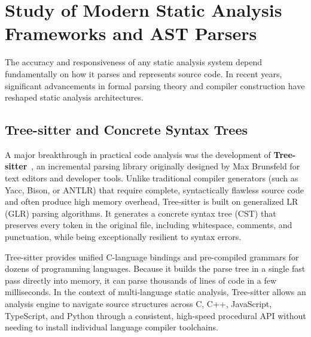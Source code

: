\section{Study of Modern Static Analysis Frameworks and AST Parsers}
The accuracy and responsiveness of any static analysis system depend fundamentally on how it parses and represents source code. In recent years, significant advancements in formal parsing theory and compiler construction have reshaped static analysis architectures.

\subsection{Tree-sitter and Concrete Syntax Trees}
A major breakthrough in practical code analysis was the development of \textbf{Tree-sitter}~\cite{treesitter}, an incremental parsing library originally designed by Max Brunsfeld for text editors and developer tools. Unlike traditional compiler generators (such as Yacc, Bison, or ANTLR) that require complete, syntactically flawless source code and often produce high memory overhead, Tree-sitter is built on generalized LR (GLR) parsing algorithms. It generates a concrete syntax tree (CST) that preserves every token in the original file, including whitespace, comments, and punctuation, while being exceptionally resilient to syntax errors. 

Tree-sitter provides unified C-language bindings and pre-compiled grammars for dozens of programming languages. Because it builds the parse tree in a single fast pass directly into memory, it can parse thousands of lines of code in a few milliseconds. In the context of multi-language static analysis, Tree-sitter allows an analysis engine to navigate source structures across C, C++, JavaScript, TypeScript, and Python through a consistent, high-speed procedural API without needing to install individual language compiler toolchains.


